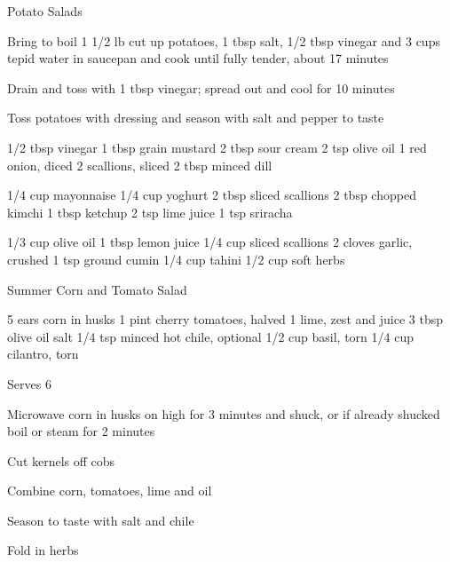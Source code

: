 \begin{densecard}{Potato Salads}{}
\begin{densesteps}
    \item Bring to boil 1 1/2 lb cut up potatoes, 1 tbsp salt, 1/2 tbsp vinegar and 3 cups tepid water in saucepan and cook until fully tender, about 17 minutes
    \item Drain and toss with 1 tbsp vinegar; spread out and cool for 10 minutes
    \item Toss potatoes with dressing and season with salt and pepper to taste
\end{densesteps}
\begin{paracol}{3}

\begin{ingredients}
1/2 tbsp vinegar
1 tbsp grain mustard
2 tbsp sour cream
2 tsp olive oil
1 red onion, diced
2 scallions, sliced
2 tbsp minced dill
\end{ingredients}
\nextcolumn
{}

\begin{ingredients}
1/4 cup mayonnaise
1/4 cup yoghurt
2 tbsp sliced scallions
2 tbsp chopped kimchi
1 tbsp ketchup
2 tsp lime juice
1 tsp sriracha
\end{ingredients}
\nextcolumn
{}

\begin{ingredients}
1/3 cup olive oil
1 tbsp lemon juice
1/4 cup sliced scallions
2 cloves garlic, crushed
1 tsp ground cumin
1/4 cup tahini
1/2 cup soft herbs
\end{ingredients}
\end{paracol}
\end{densecard}

\begin{recipe}{Summer Corn and Tomato Salad}{}
\begin{ingredients}
5 ears corn in husks
1 pint cherry tomatoes, halved
1 lime, zest and juice
3 tbsp olive oil
salt
1/4 tsp minced hot chile, optional
1/2 cup basil, torn
1/4 cup cilantro, torn
\end{ingredients}
\nextcolumn
Serves 6
\begin{steps}
    \item Microwave corn in husks on high for 3 minutes and shuck, or if already shucked boil or steam for 2 minutes
    \item Cut kernels off cobs
    \item Combine corn, tomatoes, lime and oil
    \item Season to taste with salt and chile
    \item Fold in herbs
\end{steps}
\end{recipe}

